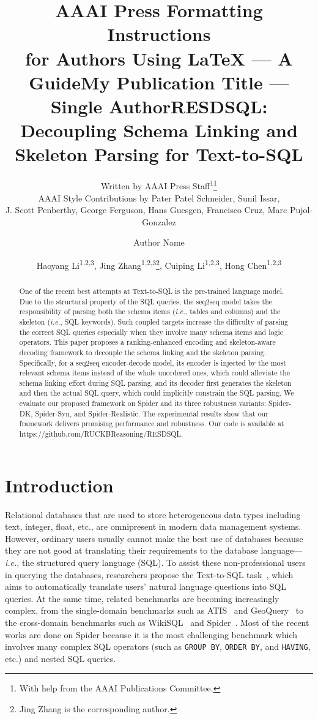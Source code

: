 \documentclass[letterpaper]{article} \usepackage{aaai23}  \usepackage{times}  \usepackage{helvet}  \usepackage{courier}  \usepackage[hyphens]{url}  \usepackage{graphicx} \urlstyle{rm} \def\UrlFont{\rm}  \usepackage{natbib}  \usepackage{caption} \frenchspacing  \setlength{\pdfpagewidth}{8.5in}  \setlength{\pdfpageheight}{11in}  \usepackage{algorithm}
\title{AAAI Press Formatting Instructions \\for Authors Using \LaTeX{} --- A Guide}
\author{
Written by AAAI Press Staff\textsuperscript{\rm 1}\thanks{With help from the AAAI Publications Committee.}\\
    AAAI Style Contributions by Pater Patel Schneider,
    Sunil Issar,\\
    J. Scott Penberthy,
    George Ferguson,
    Hans Guesgen,
    Francisco Cruz\equalcontrib,
    Marc Pujol-Gonzalez\equalcontrib
}
\title{My Publication Title --- Single Author}
\author {
    Author Name
}
\title{RESDSQL: Decoupling Schema Linking and Skeleton Parsing for Text-to-SQL}
\author {
Haoyang Li\textsuperscript{\rm 1,\rm 2,\rm 3},
    Jing Zhang\textsuperscript{\rm 1,\rm 2,\rm 3}\thanks{Jing Zhang is the corresponding author.},
    Cuiping Li\textsuperscript{\rm 1,\rm 2,\rm 3},
    Hong Chen\textsuperscript{\rm 1,\rm 2,\rm 3}
}
\begin{document}
\maketitle

\begin{abstract}
One of the recent best attempts at Text-to-SQL is the pre-trained language model. Due to the structural property of the SQL queries, the seq2seq model takes the responsibility of parsing both the schema items (\emph{i.e.}, tables and columns) and the skeleton (\emph{i.e.}, SQL keywords). Such coupled targets increase the difficulty of parsing the correct SQL queries especially when they involve many schema items and logic operators. This paper proposes a ranking-enhanced encoding and skeleton-aware decoding framework to decouple the schema linking and the skeleton parsing. Specifically, for a seq2seq encoder-decode model, its encoder is injected by the most relevant schema items instead of the whole unordered ones, which could alleviate the schema linking effort during SQL parsing, and its decoder first generates the skeleton and then the actual SQL query, which could implicitly constrain the SQL parsing. We evaluate our proposed framework on Spider and its three robustness variants: Spider-DK, Spider-Syn, and Spider-Realistic. The experimental results show that our framework delivers promising performance and robustness. Our code is available at https://github.com/RUCKBReasoning/RESDSQL.
\end{abstract}

\section{Introduction}
Relational databases that are used to store heterogeneous data types including text, integer, float, etc., are omnipresent in modern data management systems. 
However, ordinary users usually cannot make the best use of databases because they are not good at translating their requirements to the database language---\emph{i.e.}, the structured query language (SQL). 
To assist these non-professional users in querying the databases, researchers propose the Text-to-SQL task~\citep{tao2018typesql, ruichu2018an}, which aims to automatically translate users' natural language questions into SQL queries. 
At the same time, related benchmarks are becoming increasingly complex, from the single-domain benchmarks such as ATIS~\citep{srinivasan2017learning} and GeoQuery~\citep{john1996learning} to the cross-domain benchmarks such as WikiSQL~\citep{victor2017seq2sql} and Spider~\citep{tao2018spider}. Most of the recent works are done on Spider because it is the most challenging benchmark which involves many complex SQL operators (such as \texttt{GROUP BY}, \texttt{ORDER BY}, and \texttt{HAVING}, etc.) and nested SQL queries.
\end{document}
